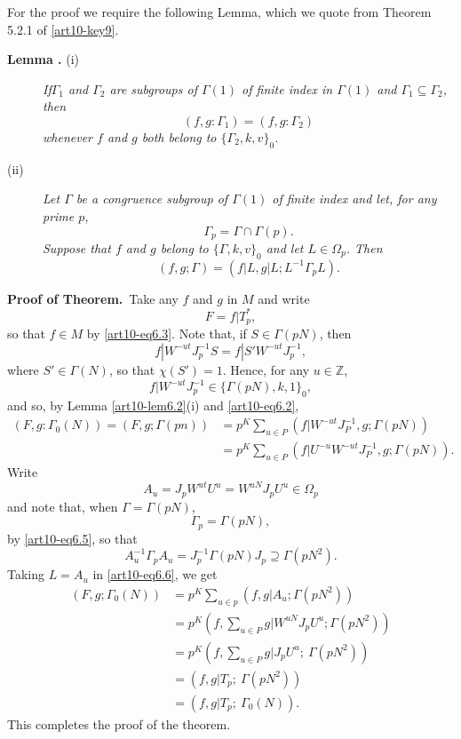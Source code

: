 For the proof we require the following Lemma, which we quote from Theorem 5.2.1 of \ref{art10-key9}.

\medskip
\begin{description}
\item[{\bf Lemma .\label{art10-lem6.2}} {\rm (i)}] {\em If\pageoriginale $\Gamma_{1}$ and $\Gamma_{2}$ are subgroups of $\Gamma(1)$ of finite index in $\Gamma(1)$ and $\Gamma_{1}\subseteq \Gamma_{2}$, then}
$$
(f,g:\Gamma_{1})=(f,g:\Gamma_{2})
$$
{\em whenever $f$ and $g$ both belong to $\{\Gamma_{2},k,v\}_{0}$.}

\item[{\rm(ii)}] {\em Let $\Gamma$ be a congruence subgroup of $\Gamma(1)$ of finite index and let, for any prime $p$,}
\begin{equation}
\Gamma_{p}=\Gamma\cap\Gamma(p).\label{art10-eq6.5}
\end{equation}
{\em Suppose that $f$ and $g$ belong to $\{\Gamma,k,v\}_{0}$ and let $L\in \Omega_{p}$. Then}
\begin{equation}
(f,g;\Gamma)=(f|L,g|L;L^{-1}\Gamma_{p}L).\label{art10-eq6.6}
\end{equation}
\end{description}

\noindent
{\bf Proof of Theorem.}~Take any $f$ and $g$ in $M$ and write
$$
F=f|T^{*}_{p},
$$
so that $f\in M$ by \eqref{art10-eq6.3}. Note that, if $S\in \Gamma(pN)$, then
$$
f|W^{-ut}J^{-1}_{p}S=f|S'W^{-ut}J^{-1}_{p},
$$
where $S'\in\Gamma(N)$, so that $\chi(S')=1$. Hence, for any $u\in \mathbb{Z}$,
$$
f|W^{-ut}J^{-1}_{p}\in \{\Gamma(pN),k,1\}_{0},
$$
and so, by Lemma \ref{art10-lem6.2}(i) and \eqref{art10-eq6.2},
\begin{align*}
(F,g:\Gamma_{0}(N))=(F,g;\Gamma(pn)) &= p^{K}\sum\limits_{u\in P}(f|W^{-ut}J^{-1}_{P},g;\Gamma(pN))\\[3pt]
&= p^{K}\sum\limits_{u\in P}(f|U^{-u}W^{-ut}J^{-1}_{P},g;\Gamma(pN)).
\end{align*}
Write
$$
A_{u}=J_{p}W^{ut}U^{u}=W^{uN}J_{p}U^{u}\in \Omega_{p}
$$
and note that, when $\Gamma=\Gamma(pN)$,
$$
\Gamma_{p}=\Gamma(pN),
$$
by \eqref{art10-eq6.5}, so that
$$
A_{u}^{-1}\Gamma_{p}A_{u}=J^{-1}_{p}\Gamma(pN)J_{p}\supseteq \Gamma(pN^{2}).
$$
Taking $L=A_{u}$ in \eqref{art10-eq6.6}, we get
\begin{align*}
(F,g;\Gamma_{0}(N)) &= p^{K}\sum\limits_{u\in p}(f,g|A_{u};\Gamma(pN^{2}))\\
&= p^{K}\left(f,\sum\limits_{u\in P}g|W^{uN}J_{p}U^{u};\Gamma(pN^{2})\right)\\
&= p^{K}\left(f,\sum\limits_{u\in P}g|J_{p}U^{u}; \ \Gamma(pN^{2})\right)\\
&= (f,g|T_{p}; \ \Gamma(pN^{2}))\\[3pt]
&= (f,g|T_{p}; \ \Gamma_{0}(N)).
\end{align*}
This completes the proof of the theorem.

